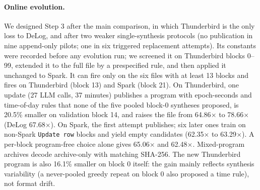 \paragraph{Online evolution.} We designed Step 3 after the main comparison, in which Thunderbird is the only loss to DeLog, and after two weaker single-synthesis protocols (no publication in nine append-only pilots; one in six triggered replacement attempts). Its constants were recorded before any evolution run; we screened it on Thunderbird blocks 0--99, extended it to the full file by a prespecified rule, and then applied it unchanged to Spark. It can fire only on the six files with at least 13 blocks and fires on Thunderbird (block 13) and Spark (block 21). On Thunderbird, one update (27 LLM calls, 37 minutes) publishes a program with epoch-seconds and time-of-day rules that none of the five pooled block-0 syntheses proposed, is 20.5\% smaller on validation block 14, and raises the file from 64.86$\times$ to 78.66$\times$ (DeLog 67.68$\times$). On Spark, the first attempt publishes; six later ones train on non-Spark \texttt{Update row} blocks and yield empty candidates (62.35$\times$ to 63.29$\times$). A per-block program-free choice alone gives 65.06$\times$ and 62.48$\times$. Mixed-program archives decode archive-only with matching SHA-256. The new Thunderbird program is also 16.1\% smaller on block 0 itself: the gain mainly reflects synthesis variability (a never-pooled greedy repeat on block 0 also proposed a time rule), not format drift.
